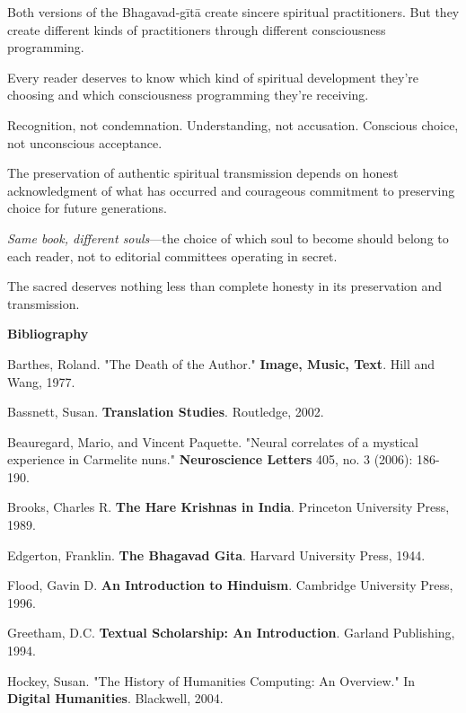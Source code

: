 \documentclass[11pt,twoside]{book}
\makeatletter
\def\cleardoublepage{\clearpage\if@twoside \ifodd\c@page\else\hbox{}\thispagestyle{empty}\newpage\if@twocolumn\hbox{}\newpage\fi\fi\fi}
\makeatother
\begin{document}
Both versions of the Bhagavad-gītā create sincere spiritual practitioners. But they create different kinds of practitioners through different consciousness programming.

Every reader deserves to know which kind of spiritual development they're choosing and which consciousness programming they're receiving.

Recognition, not condemnation. Understanding, not accusation. Conscious choice, not unconscious acceptance.

The preservation of authentic spiritual transmission depends on honest acknowledgment of what has occurred and courageous commitment to preserving choice for future generations.

\textit{Same book, different souls}—the choice of which soul to become should belong to each reader, not to editorial committees operating in secret.

The sacred deserves nothing less than complete honesty in its preservation and transmission.

\clearpage
\thispagestyle{empty}
\mbox{}
\newpage
\pagestyle{sectionopening}
\cleardoublepage
\thispagestyle{empty}
\vspace*{0.25\textheight}
\begin{center}
{\Huge\bfseries Bibliography}
\end{center}
\vspace*{\fill}
\cleardoublepage

Barthes, Roland. "The Death of the Author." \textbf{Image, Music, Text}. Hill and Wang, 1977.

Bassnett, Susan. \textbf{Translation Studies}. Routledge, 2002.

Beauregard, Mario, and Vincent Paquette. "Neural correlates of a mystical experience in Carmelite nuns." \textbf{Neuroscience Letters} 405, no. 3 (2006): 186-190.

Brooks, Charles R. \textbf{The Hare Krishnas in India}. Princeton University Press, 1989.

Edgerton, Franklin. \textbf{The Bhagavad Gita}. Harvard University Press, 1944.

Flood, Gavin D. \textbf{An Introduction to Hinduism}. Cambridge University Press, 1996.

Greetham, D.C. \textbf{Textual Scholarship: An Introduction}. Garland Publishing, 1994.

Hockey, Susan. "The History of Humanities Computing: An Overview." In \textbf{Digital Humanities}. Blackwell, 2004.
\end{document}
